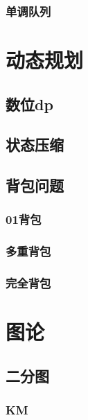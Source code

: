 \documentclass{ctexart}
\begin{document}
\subsubsection{单调队列}



\section{动态规划}
\subsection{数位dp}

\subsection{状态压缩}

\subsection{背包问题}
\subsubsection{01背包}

\subsubsection{多重背包}

\subsubsection{完全背包}








\section{图论}
\subsection{二分图}
\subsubsection{KM}

\end{document}
